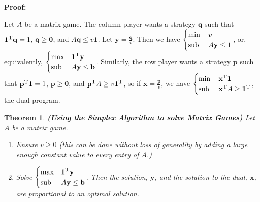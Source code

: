 \documentclass{article}
\theoremstyle{colontheorem}
\newtheorem{theorem}{Theorem}[section]
\newcommand{\T}{^\textnormal{T}}
\newcommand{\Sub}{\textnormal{sub }}
\newenvironment{Theorem}
{
	\begin{mdframed}[backgroundcolor=TheoremOrange!10]
	\begin{theorem}
}
{
	\end{theorem}
	\end{mdframed}
	
	\vspace{.15in}
}
\newenvironment{Proof}
{
	\vspace{-.3in}
	
	\begin{mdframed}[backgroundcolor=ProofPurple!10]
	\textbf{Proof:}%
}
{
	\end{mdframed}
	
	\vspace{.15in}
}
\begin{document}
\begin{Proof}
	Let $A$ be a matrix game. The column player wants a strategy $\mathbf{q}$ such that $\mathbf{1}\T \mathbf{q} = 1$, $\mathbf{q} \geq \mathbf{0}$, and $A \mathbf{q} \leq v \mathbf{1}$. Let $\mathbf{y} = \frac{\mathbf{q}}{v}$. Then we have $
	\begin{cases}
	\min & v\\
	\Sub & A \mathbf{y} \leq \mathbf{1}
	\end{cases}$, or, equivalently, $
	\begin{cases}
	\max & \mathbf{1}\T \mathbf{y}\\
	\Sub & A \mathbf{y} \leq \mathbf{b}
	\end{cases}$. Similarly, the row player wants a strategy $\mathbf{p}$ such that $\mathbf{p}\T \mathbf{1} = 1$, $\mathbf{p} \geq \mathbf{0}$, and $\mathbf{p}\T A \geq v \mathbf{1}\T$, so if $\mathbf{x} = \frac{\mathbf{p}}{v}$, we have $
	\begin{cases}
	\min & \mathbf{x}\T \mathbf{1}\\
	\Sub & \mathbf{x}\T A \geq \mathbf{1}\T
	\end{cases}$, the dual program.
	
\end{Proof}



\begin{Theorem}
	
	\textbf{(Using the Simplex Algorithm to solve Matrix Games)} Let $A$ be a matrix game.
	
	\begin{enumerate}
		
		\item Ensure $v \geq 0$ (this can be done without loss of generality by adding a large enough constant value to every entry of $A$.)
		
		\item Solve $
		\begin{cases}
		\max & \mathbf{1}\T \mathbf{y}\\
		\Sub & A \mathbf{y} \leq \mathbf{b}
		\end{cases}$. Then the solution, $\mathbf{y}$, and the solution to the dual, $\mathbf{x}$, are \textit{proportional} to an optimal solution.
		
	\end{enumerate}
	
\end{Theorem}
\end{document}
